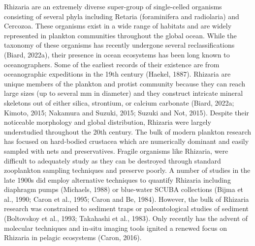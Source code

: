 \documentclass[
]{article}
\begin{document}
Rhizaria are an extremely diverse super-group of single-celled organisms
consisting of several phyla including Retaria (foraminifera and
radiolaria) and Cercozoa. These organisms exist in a wide range of
habitats and are widely represented in plankton communities throughout
the global ocean. While the taxonomy of these organisms has recently
undergone several reclassifications (Biard, 2022a), their presence in
ocean ecosystems has been long known to oceanographers. Some of the
earliest records of their existence are from oceanographic expeditions
in the 19th century (Haekel, 1887). Rhizaria are unique members of the
plankton and protist community because they can reach large sizes (up to
several mm in diameter) and they construct intricate mineral skeletons
out of either silica, strontium, or calcium carbonate (Biard, 2022a;
Kimoto, 2015; Nakamura and Suzuki, 2015; Suzuki and Not, 2015). Despite
their noticeable morphology and global distribution, Rhizaria were
largely understudied throughout the 20th century. The bulk of modern
plankton research has focused on hard-bodied crustacea which are
numerically dominant and easily sampled with nets and preservatives.
Fragile organisms like Rhizaria, were difficult to adequately study as
they can be destroyed through standard zooplankton sampling techniques
and preserve poorly. A number of studies in the late 1900s did employ
alternative techniques to quantify Rhizaria including diaphragm pumps
(Michaels, 1988) or blue-water SCUBA collections (Bijma et al., 1990;
Caron et al., 1995; Caron and Be, 1984). However, the bulk of Rhizaria
research was constrained to sediment traps or paleontological studies of
sediment (Boltovskoy et al., 1993; Takahashi et al., 1983). Only
recently has the advent of molecular techniques and in-situ imaging
tools ignited a renewed focus on Rhizaria in pelagic ecosystems (Caron,
2016).
\end{document}
